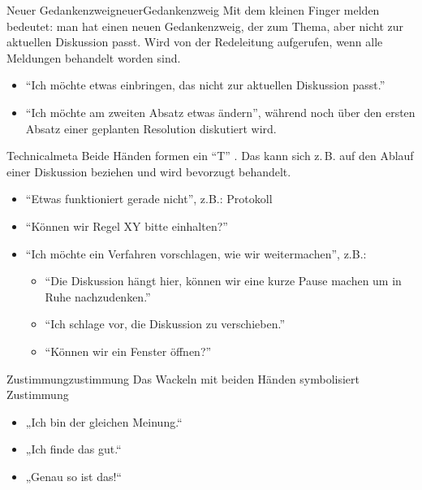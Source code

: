 \begin{handzeichen}[.2\linewidth]{Neuer Gedankenzweig}{neuerGedankenzweig}
	Mit dem kleinen Finger melden bedeutet: man hat einen neuen Gedankenzweig, der zum Thema, aber nicht zur aktuellen Diskussion passt. Wird von der Redeleitung aufgerufen, wenn alle Meldungen behandelt worden sind.
	
	\begin{itemize}
		\item \enquote{Ich möchte etwas einbringen, das nicht zur aktuellen Diskussion passt.}
		\item  \enquote{Ich möchte am zweiten Absatz etwas ändern}, während noch über den ersten Absatz einer geplanten Resolution diskutiert wird.
	\end{itemize}
\end{handzeichen}


\begin{handzeichen}{Technical}{meta}
Beide Händen formen ein \enquote{T} .
Das kann sich z.\,B. auf den Ablauf einer Diskussion beziehen und wird bevorzugt behandelt.
\begin{itemize}
	\item \enquote{Etwas funktioniert gerade nicht}, z.B.: Protokoll
	\item \enquote{Können wir Regel XY bitte einhalten?}
	\item \enquote{Ich möchte ein Verfahren vorschlagen, wie wir weitermachen}, z.B.:
	\begin{itemize}
	    \item \enquote{Die Diskussion hängt hier, können wir eine kurze Pause machen um in Ruhe nachzudenken.}
    	\item \enquote{Ich schlage vor, die Diskussion zu verschieben.}
	    \item \enquote{Können wir ein Fenster öffnen?}
	\end{itemize}
\end{itemize}
\end{handzeichen}

\begin{handzeichen}{Zustimmung}{zustimmung}
Das Wackeln mit beiden Händen symbolisiert Zustimmung 
\begin{itemize}
	\item „Ich bin der gleichen Meinung.“
	\item „Ich finde das gut.“
	\item „Genau so ist das!“
\end{itemize}
\end{handzeichen}


